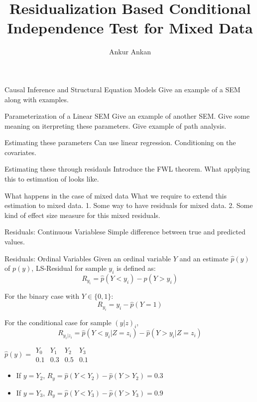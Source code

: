 \documentclass{beamer}
\begin{document}
\title[]{Residualization Based Conditional Independence Test for Mixed Data}
\author{Ankur Ankan}
\date{}

\maketitle

\begin{frame}{Causal Inference and Structural Equation Models}
	Give an example of a SEM along with examples.
\end{frame}

\begin{frame}{Parameterization of a Linear SEM}
	Give an example of another SEM.
	Give some meaning on iterpreting these parameters.
	Give example of path analysis.
\end{frame}

\begin{frame}{Estimating these parameters}
	Can use linear regression.
	Conditioning on the covariates.
\end{frame}

\begin{frame}{Estimating these through residauls}
	Introduce the FWL theorem.
	What applying this to estimation of looks like.
\end{frame}

\begin{frame}{What happens in the case of mixed data}
	What we require to extend this estimation to mixed data.
	1. Some way to have residuals for mixed data.
	2. Some kind of effect size measure for this mixed residuals.
\end{frame}

\begin{frame}{Residuals: Continuous Variablese}
	Simple difference between true and predicted values.
\end{frame}

\begin{frame}{Residuals: Ordinal Variables}
	Given an ordinal variable $ Y $ and an estimate $ \hat{p}(y) $ of $
	p(y) $, LS-Residual for sample $ y_i $ is defined as:
	$$ R_{y_i} = \hat{p}(Y < y_i) - \hat{p}(Y > y_i) $$
	\vspace{1em}

	For the binary case with $ Y \in \{0, 1\} $:
	$$ R_{y_i} = y_i - \hat{p}(Y = 1) $$
	\vspace{1em}

	For the conditional case for sample $ (y|z)_i $,
	$$ R_{y_i | z_i} = \hat{p}(Y < y_i | Z=z_i) - \hat{p}(Y>y_i|Z=z_i) $$

	$ \hat{p}(y) = \begin{array}{llll} Y_0 & Y_1 & Y_2 & Y_3 \\ 0.1 & 0.3 & 0.5 & 0.1 \end{array} $
	\begin{itemize}
		\item If $ y = Y_2 $, $ R_{y} = \hat{p}(Y < Y_2) - \hat{p}(Y > Y_2) = 0.3 $
		\item If $ y = Y_3 $, $ R_{y} = \hat{p}(Y < Y_3) - \hat{p}(Y > Y_3) = 0.9 $
	\end{itemize}
\end{frame}
\end{document}
